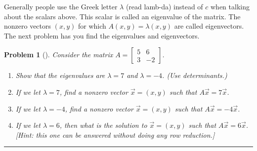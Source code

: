 \documentclass[letterpaper,oneside]{book}%
\theoremstyle{plain}
\theoremstyle{box}
\theoremstyle{problem}
\newtheorem{problemnum}{Problem}[chapter]
\newenvironment{problem}[1][]{\begin{problemnum}[#1]}{\end{problemnum}\nopagebreak\hrule\bigskip}
\newcommand{\bvec}[1]{\begin{bmatrix} #1 \end{bmatrix}}
\begin{document}
Generally people use the Greek letter $\lambda$ (read lamb-da) instead of $c$ when talking about the scalars above.  This scalar is called an eigenvalue of the matrix.  The nonzero vectors $(x,y)$ for which $A(x,y)=\lambda(x,y)$ are called eigenvectors.  The next problem has you find the eigenvalues and eigenvectors.


\begin{problem}
 Consider the matrix $A=\bvec{5&6\\3&-2}$. 
\begin{enumerate}
 \item Show that the eigenvalues are $\lambda = 7$ and $\lambda = -4$. (Use determinants.)
 \item If we let $\lambda = 7$, find a nonzero vector $\vec x = (x,y)$ such that $A\vec x = 7\vec x$.  
 \item If we let $\lambda = -4$, find a nonzero vector $\vec x = (x,y)$ such that $A\vec x = -4\vec x$.  
 \item If we let $\lambda = 6$, then what is the solution to $\vec x = (x,y)$ such that $A\vec x = 6\vec x$. [Hint: this one can be answered without doing any row reduction.] 
\end{enumerate}

\end{problem}
\end{document}
